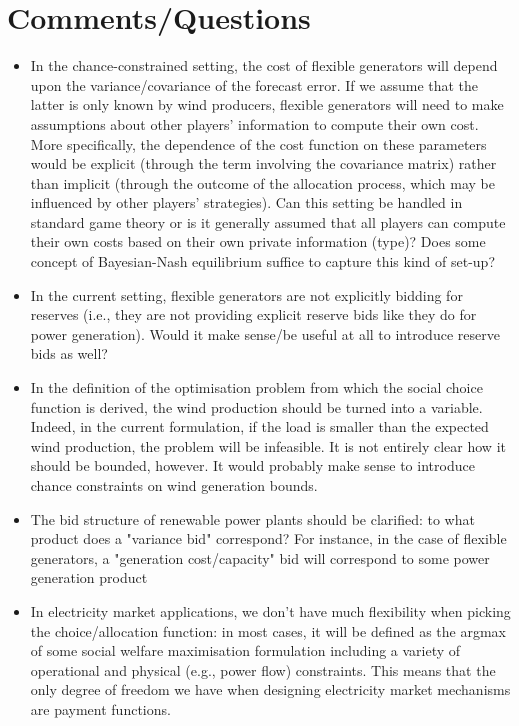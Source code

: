 \documentclass{article}
\begin{document}
\section{Comments/Questions}

\begin{itemize}
\item In the chance-constrained setting, the cost of flexible generators will depend upon the variance/covariance of the forecast error. If we assume that the latter is only known by wind producers, flexible generators will need to make assumptions about other players' information to compute their own cost. More specifically, the dependence of the cost function on these parameters would be explicit (through the term involving the covariance matrix) rather than implicit (through the outcome of the allocation process, which may be influenced by other players' strategies). Can this setting be handled in standard game theory or is it generally assumed that all players can compute their own costs based on their own private information (type)? Does some concept of Bayesian-Nash equilibrium suffice to capture this kind of set-up?
\item In the current setting, flexible generators are not explicitly bidding for reserves (i.e., they are not providing explicit reserve bids like they do for power generation). Would it make sense/be useful at all to introduce reserve bids as well?
\item In the definition of the optimisation problem from which the social choice function is derived, the wind production should be turned into a variable. Indeed, in the current formulation, if the load is smaller than the expected wind production, the problem will be infeasible. It is not entirely clear how it should be bounded, however. It would probably make sense to introduce chance constraints on wind generation bounds. 
\item The bid structure of renewable power plants should be clarified: to what product does a "variance bid" correspond? For instance, in the case of flexible generators, a "generation cost/capacity" bid will correspond to some power generation product 
\item In electricity market applications, we don't have much flexibility when picking the choice/allocation function: in most cases, it will be defined as the argmax of some social welfare maximisation formulation including a variety of operational and physical (e.g., power flow) constraints. This means that the only degree of freedom we have when designing electricity market mechanisms are payment functions. 

\end{itemize}
\end{document}
